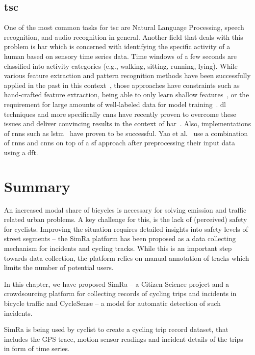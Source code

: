 \subsection{\acl{tsc}}
\label{subsec:tsc}
One of the most common tasks for \ac{tsc} are Natural Language Processing, speech recognition, and audio recognition in general.
Another field that deals with this problem is \acf{har} which is concerned with identifying the specific activity of a human based on sensory time series data.
Time windows of a few seconds are classified into activity categories (e.g., walking, sitting, running, lying).
While various feature extraction and pattern recognition methods have been successfully applied in the past in this context~\cite{bulling2014tutorial}, those approaches have constraints such as hand-crafted feature extraction, being able to only learn shallow features~\cite{yang2015deep}, or the requirement for large amounts of well-labeled data for model training~\cite{wang2019deep}.
\acl{dl} techniques and more specifically \acp{cnn} have recently proven to overcome these issues and deliver convincing results in the context of \ac{har}~\cite{wang2019deep,ronao2015deep}.
Also, implementations of \acp{rnn} such as \ac{lstm}~\cite{tao2016multicolumn,yao2017deepsense} have proven to be successful.
Yao et al.\ \cite{yao2017deepsense} use a combination of \acp{rnn} and \acp{cnn} on top of a \ac{sf} approach after preprocessing their input data using a \ac{dft}.

\section{Summary}
\label{sec:summary_cyclesense}
An increased modal share of bicycles is necessary for solving emission and traffic related urban problems.
A key challenge for this, is the lack of (perceived) safety for cyclists.
Improving the situation requires detailed insights into safety levels of street segments -- the SimRa platform has been proposed as a data collecting mechanism for incidents and cycling tracks.
While this is an important step towards data collection, the platform relies on manual annotation of tracks which limits the number of potential users.

In this chapter, we have proposed SimRa -- a Citizen Science project and a crowdsourcing platform for collecting records of cycling trips and incidents in bicycle traffic and CycleSense -- a model for automatic detection of such incidents.

SimRa is being used by cyclist to create a cycling trip record dataset, that includes the GPS trace, motion sensor readings and incident details of the trips in form of time series.

